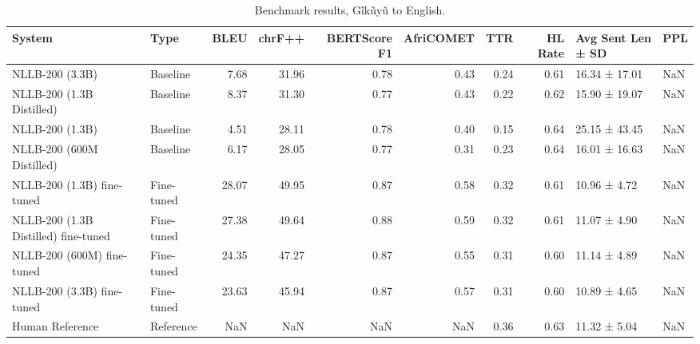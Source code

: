 \begin{table}
\caption{Benchmark results, Gĩkũyũ to English.}
\label{tab:results_kik2eng}
\begin{tabular}{llrrrrrrll}
\toprule
System & Type & BLEU & chrF++ & BERTScore F1 & AfriCOMET & TTR & HL Rate & Avg Sent Len ± SD & PPL \\
\midrule
NLLB-200 (3.3B) & Baseline & 7.68 & 31.96 & 0.78 & 0.43 & 0.24 & 0.61 & 16.34 ± 17.01 & NaN \\
NLLB-200 (1.3B Distilled) & Baseline & 8.37 & 31.30 & 0.77 & 0.43 & 0.22 & 0.62 & 15.90 ± 19.07 & NaN \\
NLLB-200 (1.3B) & Baseline & 4.51 & 28.11 & 0.78 & 0.40 & 0.15 & 0.64 & 25.15 ± 43.45 & NaN \\
NLLB-200 (600M Distilled) & Baseline & 6.17 & 28.05 & 0.77 & 0.31 & 0.23 & 0.64 & 16.01 ± 16.63 & NaN \\
NLLB-200 (1.3B) fine-tuned & Fine-tuned & 28.07 & 49.95 & 0.87 & 0.58 & 0.32 & 0.61 & 10.96 ± 4.72 & NaN \\
NLLB-200 (1.3B Distilled) fine-tuned & Fine-tuned & 27.38 & 49.64 & 0.88 & 0.59 & 0.32 & 0.61 & 11.07 ± 4.90 & NaN \\
NLLB-200 (600M) fine-tuned & Fine-tuned & 24.35 & 47.27 & 0.87 & 0.55 & 0.31 & 0.60 & 11.14 ± 4.89 & NaN \\
NLLB-200 (3.3B) fine-tuned & Fine-tuned & 23.63 & 45.94 & 0.87 & 0.57 & 0.31 & 0.60 & 10.89 ± 4.65 & NaN \\
Human Reference & Reference & NaN & NaN & NaN & NaN & 0.36 & 0.63 & 11.32 ± 5.04 & NaN \\
\bottomrule
\end{tabular}
\end{table}
